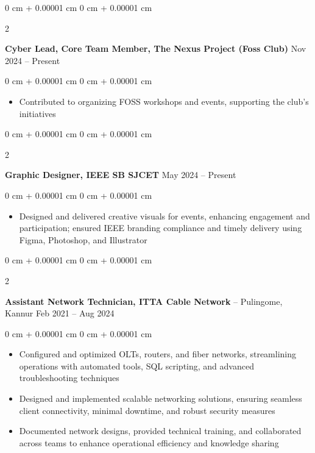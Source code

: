 \documentclass[10pt, letterpaper]{article}
\newenvironment{highlights}{
    \begin{itemize}[
        topsep=0.10 cm,
        parsep=0.10 cm,
        partopsep=0pt,
        itemsep=0pt,
        leftmargin=0 cm + 10pt
    ]
}{
    \end{itemize}
} %
\newenvironment{onecolentry}{
    \begin{adjustwidth}{
        0 cm + 0.00001 cm
    }{
        0 cm + 0.00001 cm
    }
}{
    \end{adjustwidth}
} %
\newenvironment{twocolentry}[2][]{
    \onecolentry
    \def\secondColumn{#2}
    \setcolumnwidth{\fill, 4.5 cm}
    \begin{paracol}{2}
}{
    \switchcolumn \raggedleft \secondColumn
    \end{paracol}
    \endonecolentry
} %
\begin{document}
        \vspace{0.2 cm}

 \begin{twocolentry}{
            Nov 2024 – Present
        }
            \textbf{Cyber Lead, Core Team Member, The Nexus Project (Foss Club)}\end{twocolentry}

        \vspace{0.10 cm}
        \begin{onecolentry}
            \begin{highlights}
                \item Contributed to organizing FOSS workshops and events, supporting the club's initiatives
            \end{highlights}
        \end{onecolentry}


        \vspace{0.2 cm}
        
        \begin{twocolentry}{
            May 2024 – Present
        }
            \textbf{Graphic Designer, IEEE SB SJCET}\end{twocolentry}

        \vspace{0.10 cm}
        \begin{onecolentry}
            \begin{highlights}
                \item Designed and delivered creative visuals for events, enhancing engagement and participation; ensured IEEE branding compliance and timely delivery using Figma, Photoshop, and Illustrator
            \end{highlights}
        \end{onecolentry}


        \vspace{0.2 cm}

        \begin{twocolentry}{
            Feb 2021 – Aug 2024
        }
            \textbf{Assistant Network Technician, ITTA Cable Network} -- Pulingome, Kannur\end{twocolentry}

        \vspace{0.10 cm}
        \begin{onecolentry}
            \begin{highlights}
                \item Configured and optimized OLTs, routers, and fiber networks, streamlining operations with automated tools, SQL scripting, and advanced troubleshooting techniques
                \item Designed and implemented scalable networking solutions, ensuring seamless client connectivity, minimal downtime, and robust security measures
                \item Documented network designs, provided technical training, and collaborated across teams to enhance operational efficiency and knowledge sharing
            \end{highlights}
        \end{onecolentry}
\end{document}
